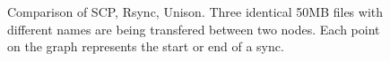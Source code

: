 \documentclass[12pt]{article}
\begin{document}

\begin{figure}[htp]
    \caption{Comparison of SCP, Rsync, Unison. Three identical 50MB files 
    with different names are being transfered between two nodes. Each
    point on the graph represents the start or end of a sync.}
    \label{fig:point_comp_graph}
\end{figure}
\end{document}
